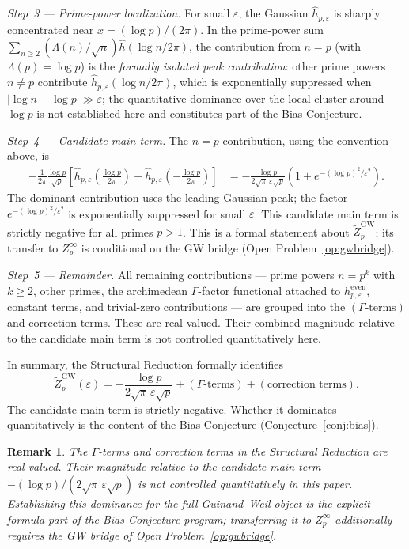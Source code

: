 \documentclass[11pt]{article}
\newtheorem*{remark}{Remark}
\begin{document}
\textit{Step~3 --- Prime-power localization.}
For small $\varepsilon$, the Gaussian $\hat{h}_{p,\varepsilon}$ is
sharply concentrated near $x=(\log p)/(2\pi)$.
In the prime-power sum $\sum_{n\geq 2}(\Lambda(n)/\sqrt{n})\hat{h}(\log n/2\pi)$,
the contribution from $n=p$ (with $\Lambda(p)=\log p$) is the
\textit{formally isolated peak contribution}: other prime powers $n\neq p$ contribute
$\hat{h}_{p,\varepsilon}(\log n / 2\pi)$,
which is exponentially suppressed when
$|\log n - \log p| \gg \varepsilon$;
the quantitative dominance over the local
cluster around $\log p$ is not established
here and constitutes part of the Bias Conjecture.

\textit{Step~4 --- Candidate main term.}
The $n=p$ contribution, using the convention above, is
\begin{align*}
-\frac{1}{2\pi}\frac{\log p}{\sqrt{p}}
\left[\hat{h}_{p,\varepsilon}\!\left(\frac{\log p}{2\pi}\right)
+\hat{h}_{p,\varepsilon}\!\left(-\frac{\log p}{2\pi}\right)\right]
&= -\frac{\log p}{2\sqrt{\pi}\,\varepsilon\sqrt{p}}
  \left(1+e^{-(\log p)^2/\varepsilon^2}\right).
\end{align*}
The dominant contribution uses the leading Gaussian peak;
the factor $e^{-(\log p)^2/\varepsilon^2}$ is
exponentially suppressed for small $\varepsilon$.
This candidate main term is strictly negative for all primes $p>1$.
This is a formal statement about $\widetilde Z_p^{\mathrm{GW}}$;
its transfer to $Z_p^\infty$ is conditional on the GW bridge
(Open Problem~\ref{op:gwbridge}).

\textit{Step~5 --- Remainder.}
All remaining contributions --- prime powers $n=p^k$ with $k\geq 2$,
other primes, the archimedean $\Gamma$-factor functional
attached to $h^{\mathrm{even}}_{p,\varepsilon}$,
constant terms, and trivial-zero contributions --- are grouped into
the $(\Gamma\text{-terms})$ and correction terms.
These are real-valued.
Their combined magnitude relative to the candidate main term
is not controlled quantitatively here.

In summary, the Structural Reduction formally identifies
\[
\widetilde Z_p^{\mathrm{GW}}(\varepsilon)
  = -\frac{\log p}{2\sqrt{\pi}\,\varepsilon\sqrt{p}}
    + (\Gamma\text{-terms}) + (\text{correction terms}).
\]
The candidate main term is strictly negative.
Whether it dominates quantitatively is the content of the
Bias Conjecture (Conjecture~\ref{conj:bias}).

\begin{remark}
The $\Gamma$-terms and correction terms in the Structural Reduction
are real-valued. Their magnitude relative to the candidate main term
$-(\log p)/(2\sqrt{\pi}\,\varepsilon\sqrt{p})$ is not controlled
quantitatively in this paper. Establishing this dominance for the full Guinand--Weil object is the
explicit-formula part of the Bias Conjecture program; transferring it to
$Z_p^\infty$ additionally requires the GW bridge of
Open Problem~\ref{op:gwbridge}.
\end{remark}
\end{document}
